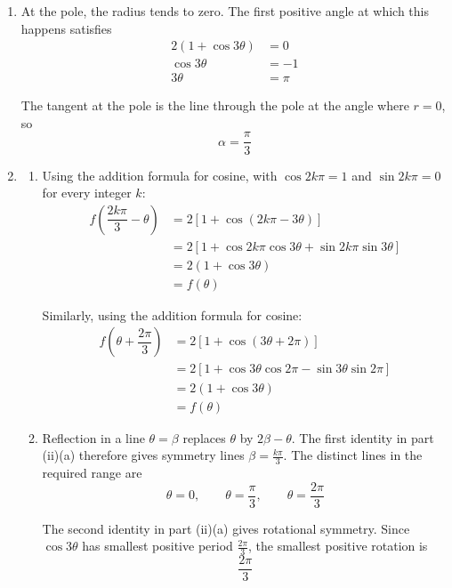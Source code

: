 \documentclass[leqno]{article}
\begin{document}
\begin{enumerate}[
  label=\textbf{\arabic*.},
  leftmargin=*,
  topsep=0pt,
  partopsep=0pt,
  parsep=0pt
]
\vspace*{10pt}

\begin{djsSolution}
\begin{enumerate}[label=\textbf{(\roman*)}, start=1]
\item
At the pole, the radius tends to zero. The first positive angle at which this happens satisfies
\begin{align*}
2(1+\cos 3\theta)&=0\\
\cos 3\theta&=-1\\
3\theta&=\pi
\end{align*}

The tangent at the pole is the line through the pole at the angle where \(r=0\), so
\[
\alpha=\dfrac{\pi}{3}
\]

\item
\begin{enumerate}[label=(\alph*), start=1]
\item Using the addition formula for cosine, with \(\cos 2k\pi=1\) and \(\sin 2k\pi=0\) for every integer \(k\):
\begin{align*}
f\left(\dfrac{2k\pi}{3}-\theta\right)
&=2\left[1+\cos\left(2k\pi-3\theta\right)\right]\\
&=2\left[1+\cos 2k\pi\cos 3\theta+\sin 2k\pi\sin 3\theta\right]\\
&=2(1+\cos 3\theta)\\
&=f(\theta)
\end{align*}

Similarly, using the addition formula for cosine:
\begin{align*}
f\left(\theta+\dfrac{2\pi}{3}\right)
&=2\left[1+\cos\left(3\theta+2\pi\right)\right]\\
&=2\left[1+\cos 3\theta\cos 2\pi-\sin 3\theta\sin 2\pi\right]\\
&=2(1+\cos 3\theta)\\
&=f(\theta)
\end{align*}

\item Reflection in a line \(\theta=\beta\) replaces \(\theta\) by \(2\beta-\theta\). The first identity in part (ii)(a) therefore gives symmetry lines \(\beta=\frac{k\pi}{3}\). The distinct lines in the required range are
\[
\theta=0,\qquad \theta=\dfrac{\pi}{3},\qquad \theta=\dfrac{2\pi}{3}
\]

The second identity in part (ii)(a) gives rotational symmetry. Since \(\cos 3\theta\) has smallest positive period \(\frac{2\pi}{3}\), the smallest positive rotation is
\[
\dfrac{2\pi}{3}
\]


\end{enumerate}
\end{enumerate}
\end{djsSolution}
\end{enumerate}
\end{document}
